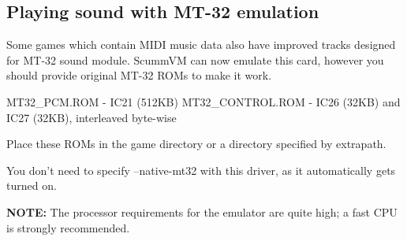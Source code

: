 

\subsection{Playing sound with MT-32 emulation}

Some games which contain MIDI music data also have improved tracks designed
for MT-32 sound module. ScummVM can now emulate this card, however you should
provide original MT-32 ROMs to make it work.

MT32_PCM.ROM     - IC21 (512KB)
MT32_CONTROL.ROM - IC26 (32KB) and IC27 (32KB), interleaved byte-wise

Place these ROMs in the game directory or a directory specified by extrapath.

You don't need to specify --native-mt32 with this driver, as it automatically
gets turned on.

\textbf{NOTE:} The processor requirements for the emulator are quite high; a fast CPU is
 strongly recommended.
